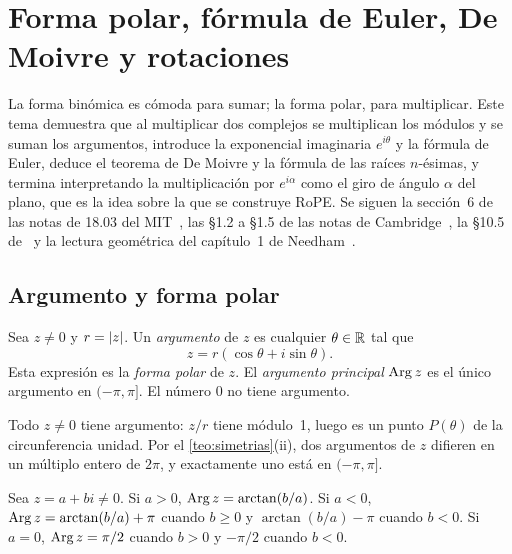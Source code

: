 \chapter{Forma polar, fórmula de Euler, De Moivre y rotaciones}
\label{tema:6}

La forma binómica es cómoda para sumar; la forma polar, para multiplicar. Este tema demuestra que al multiplicar dos complejos se multiplican los módulos y se suman los argumentos, introduce la exponencial imaginaria $e^{i\theta}$ y la fórmula de Euler, deduce el teorema de De Moivre y la fórmula de las raíces $n$-ésimas, y termina interpretando la multiplicación por $e^{i\alpha}$ como el giro de ángulo $\alpha$ del plano, que es la idea sobre la que se construye RoPE. Se siguen la sección~6 de las notas de 18.03 del MIT~\cite{mit1803}, las §1.2 a §1.5 de las notas de Cambridge~\cite{cambvm}, la §10.5 de~\cite{osat} y la lectura geométrica del capítulo~1 de Needham~\cite{needham}.

\section{Argumento y forma polar}

\begin{definicion}\label{def:polar}
Sea $z\ne0$ y $r=\lvert z\rvert$. Un \emph{argumento} de $z$ es cualquier $\theta\in\mathbb{R}$ tal que
\[
z=r(\cos\theta+i\sin\theta).
\]
Esta expresión es la \emph{forma polar} de $z$. El \emph{argumento principal} $\operatorname{Arg} z$ es el único argumento en $(-\pi,\pi]$. El número $0$ no tiene argumento.
\end{definicion}

Todo $z\ne0$ tiene argumento: $z/r$ tiene módulo~1, luego es un punto $P(\theta)$ de la circunferencia unidad. Por el \cref{teo:simetrias}(ii), dos argumentos de $z$ difieren en un múltiplo entero de $2\pi$, y exactamente uno está en $(-\pi,\pi]$.

\begin{proposicion}\label{prop:arg}
Sea $z=a+bi\ne0$. Si $a>0$, $\operatorname{Arg} z=\arctan(b/a)$. Si $a<0$, $\operatorname{Arg} z=\arctan(b/a)+\pi$ cuando $b\ge0$ y $\arctan(b/a)-\pi$ cuando $b<0$. Si $a=0$, $\operatorname{Arg} z=\pi/2$ cuando $b>0$ y $-\pi/2$ cuando $b<0$.
\end{proposicion}

\addtocounter{definicion}{1}%

